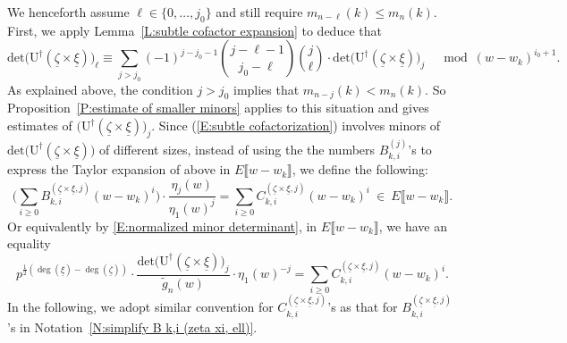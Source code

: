 \documentclass[12pt]{amsart}
\theoremstyle{definition}
\numberwithin{equation}{subsection}
\def\rmU{\mathrm{U}}
\newcommand{\Iw}{\mathrm{Iw}}
\renewcommand{\det}{\mathrm{det}}
\begin{document}
We henceforth assume $\ell \in \{0, \dots, j_0\}$ and still require $m_{n-\ell}(k) \leq m_n(k)$.
First, we apply Lemma~\ref{L:subtle cofactor expansion} to deduce that
\begin{equation}
\label{E:subtle cofactorization}
\det\big( \rmU^\dagger (\underline{\zeta} \times \underline{\xi})\big)_{\ell} \equiv  \sum_{j > j_0} (-1)^{j-j_0-1} \binom{j-\ell-1}{j_0-\ell} \binom{j}{\ell}\cdot \det \big(\rmU^\dagger(\underline{\zeta} \times \underline{\xi})\big)_j \quad \bmod (w-w_k)^{i_0+1}.
\end{equation}
As explained above, the condition $j >j_0$ implies that $
m_{n-j}(k) < m_n(k)$. So Proposition~\ref{P:estimate of smaller minors} applies to this situation and gives estimates of $\big(\rmU^\dagger(\underline{\zeta} \times \underline{\xi})\big)_j$. Since (\ref{E:subtle cofactorization}) involves minors of $\det\big(\rmU^\dagger(\underline\zeta\times \underline \xi) \big)$ of different sizes, instead of using the the numbers $B_{k, i}^{( j)}$'s to express the Taylor expansion of above in $E\llbracket w-w_k\rrbracket$, we define the following:
\begin{equation}
\label{E:definition of C}
\Big( \sum_{ i\geq 0} B_{k, i}^{(\underline \zeta \times \underline \xi, j)} (w-w_k)^i \Big) \cdot \frac{\eta_j(w)}{\eta_1(w)^j} = \sum_{ i\geq 0} C_{k, i}^{(\underline \zeta \times \underline \xi, j)} (w-w_k)^i \ \in\ E\llbracket w-w_k\rrbracket.
\end{equation}
Or equivalently by \eqref{E:normalized minor determinant}, in $E\llbracket w-w_k\rrbracket$, we have an equality
\begin{equation}
\label{E:normalized minor determinant C version}p^{\frac 12(\deg(\underline \xi) - \deg(\underline \zeta))}\cdot
\frac{
\det\big(\rmU^\dagger(\underline \zeta \times \underline \xi)\big)_j}{\tilde{g}_{n}(w)}\cdot \eta_1(w)^{-j}=\sum_{i\geq 0}C_{k,i}^{(\underline \zeta \times \underline \xi, j)}(w-w_k)^i.
\end{equation}
In the following, we adopt similar convention for $C_{k,i}^{(\underline \zeta \times \underline \xi, j)}$'s as that for $B_{k,i}^{(\underline \zeta \times \underline \xi, j)}$'s in Notation~\ref{N:simplify B k,i (zeta xi, ell)}.
\end{document}
